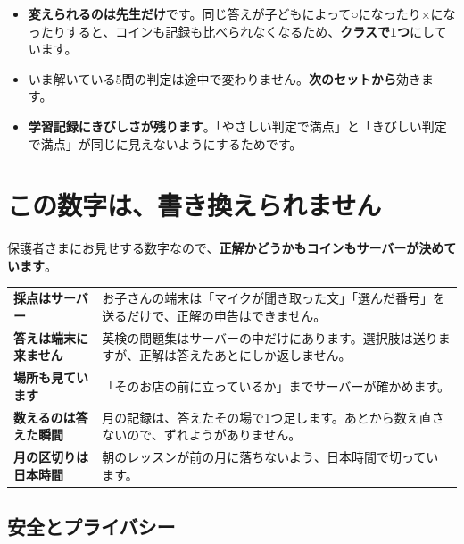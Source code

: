\documentclass[a4paper,10.5pt]{article}
\newcommand{\hl}[1]{\textbf{\color{uspeakGreen}#1}}
\begin{document}
\begin{itemize}[leftmargin=1.2em,itemsep=1pt]
  \item \hl{変えられるのは先生だけ}です。同じ答えが子どもによって○になったり×になったりすると、コインも記録も比べられなくなるため、\hl{クラスで1つ}にしています。
  \item いま解いている5問の判定は途中で変わりません。\hl{次のセットから}効きます。
  \item \hl{学習記録にきびしさが残ります}。「やさしい判定で満点」と「きびしい判定で満点」が同じに見えないようにするためです。
\end{itemize}

\section{この数字は、書き換えられません}

保護者さまにお見せする数字なので、\hl{正解かどうかもコインもサーバーが決めています}。

\begin{center}
\begin{tabular}{@{}p{}p{}@{}}
\toprule
\hl{採点はサーバー} & お子さんの端末は「マイクが聞き取った文」「選んだ番号」を送るだけで、正解の申告はできません。\\
\hl{答えは端末に来ません} & 英検の問題集はサーバーの中だけにあります。選択肢は送りますが、正解は答えたあとにしか返しません。\\
\hl{場所も見ています} & 「そのお店の前に立っているか」までサーバーが確かめます。\\
\hl{数えるのは答えた瞬間} & 月の記録は、答えたその場で1つ足します。あとから数え直さないので、ずれようがありません。\\
\hl{月の区切りは日本時間} & 朝のレッスンが前の月に落ちないよう、日本時間で切っています。\\
\bottomrule
\end{tabular}
\end{center}

\subsection{安全とプライバシー}
\end{document}

